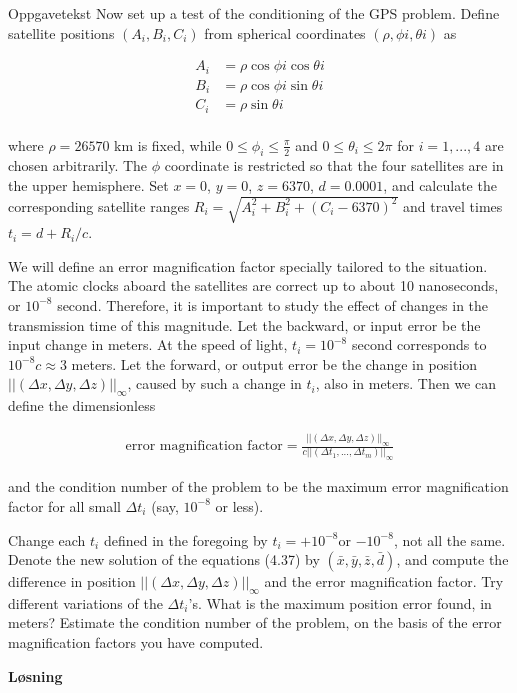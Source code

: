 
Oppgavetekst
Now set up a test of the conditioning of the GPS problem. Define satellite positions $(A_i,B_i,C_i)$ from spherical coordinates $(\rho,\phi i,\theta i)$ as

\begin{align}
	A_i &= \rho \cos{\phi i} \cos{\theta i} \nonumber \\
	B_i &= \rho \cos{\phi i} \sin{\theta i} \nonumber \\
	C_i &= \rho \sin{\theta i} \nonumber \\
\end{align}

where $\rho = 26570$ km is fixed, while $0 \leq \phi_i \leq \frac{\pi}{2}$ and $0 \leq \theta_i \leq 2 \pi$ for $i=1,...,4$ are chosen arbitrarily. The $\phi$ coordinate is restricted so that the four satellites are in the upper hemisphere. Set $x = 0$, $y = 0$, $z = 6370$, $d = 0.0001$, and calculate the corresponding satellite ranges $R_i = \sqrt{A_i^2 + B_i^2 + (C_i − 6370)^2}$ and travel times $t_i = d + R_i /c$.

We will define an error magnification factor specially tailored to the situation. The atomic clocks aboard the satellites are correct up to about 10 nanoseconds, or $10^{−8}$ second. Therefore, it is important to study the effect of changes in the transmission time of this magnitude. Let the backward, or input error be the input change in meters. At the speed of light, $t_i = 10^{−8}$ second corresponds to $10^{−8}c \approx 3$ meters. Let the forward, or output error be the change in position $||(\Delta x,\Delta y,\Delta z)||_\infty$, caused by such a change in $t_i$, also in meters. Then we can define the dimensionless 

\begin{align}
    \text{error magnification factor} = \frac{||(\Delta x,\Delta y,\Delta z)||_\infty}{c||(\Delta t_1,...,\Delta t_m)||_\infty} \nonumber
\end{align}

and the condition number of the problem to be the maximum error magnification factor for all small $\Delta t_i$ (say, $10^{−8}$ or less).

Change each $t_i$ defined in the foregoing by $t_i = +10^{-8}$or $−10^{−8}$, not all the same. Denote the new solution of the equations (4.37) by $(\bar{x},\bar{y},\bar{z},\bar{d})$, and compute the difference in position $||(\Delta x,\Delta y,\Delta z)||_\infty$ and the error magnification factor. Try different variations of the $\Delta t_i$'s. What is the maximum position error found, in meters? Estimate the condition number of the problem, on the basis of the error magnification factors you have computed. 

\textbf{Løsning}